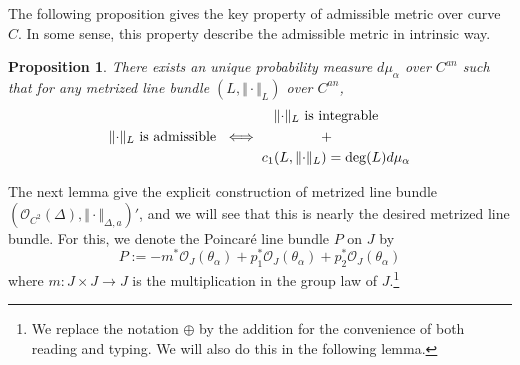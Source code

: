 \documentclass[reqno,11pt]{amsart}
\numberwithin{equation}{section}
\theoremstyle{plain}
\newtheorem{proposition}[theorem]{Proposition}
\theoremstyle{plain}
\numberwithin{equation}{section}
\theoremstyle{remark}
\DeclareMathOperator{\Id}{\operatorname{Id}}
\newcommand{\norm}[1]{\Vert{#1}\Vert}
\begin{document}
The following proposition gives the key property of admissible metric over curve $C$. In some sense, this property describe the admissible metric in intrinsic way.
\begin{proposition}
There exists an unique probability measure $d\mu_{\alpha}$ over $C^{an}$ such that for any metrized line bundle $(L,\norm{\cdot}_L)$ over $C^{an}$,
$$\norm{\cdot}_L \text{ is admissible } \iff \begin{aligned}
&\hspace{0.3cm}\norm{\cdot}_L \text{ is integrable}\\
&\hspace{1.5cm}+\\
& c_1(L,\norm{\cdot}_L)= \deg (L) d\mu_{\alpha}
\end{aligned}$$
\end{proposition}
The next lemma give the explicit construction of metrized line bundle $(\mathcal{O}_{C^2}(\Delta),\norm{\cdot}_{\Delta,a})'$, and we will see that this is nearly the desired metrized line bundle. For this, we denote the Poincaré line bundle $P$ on $J$ by
$$P:=-m^*\mathcal{O}_{J}(\theta_{\alpha})+p_1^*\mathcal{O}_{J}(\theta_{\alpha})+p_2^*\mathcal{O}_{J}(\theta_{\alpha})$$
where $m:J \times J\longrightarrow J$ is the multiplication in the group law of $J$.\footnote{We replace the notation $\oplus$ by the addition for the convenience of both reading and typing. We will also do this in the following lemma.}
\begin{center}
\end{center}
\end{document}
